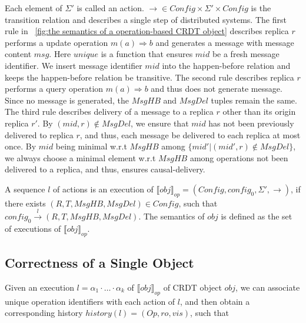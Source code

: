 {Each element of $\Sigma'$ is called an action. $\rightarrow \in \mathit{Config} \times \Sigma' \times \mathit{Config}$ is the transition relation and describes a single step of distributed systems. The first rule in \figurename~\ref{fig:the semantics of a operation-based CRDT object} describes replica $r$ performs a update operation $m(a) \Rightarrow b$ and generates a message with message content $\mathit{msg}$. Here $\mathit{unique}$ is a function that ensures $\mathit{mid}$ be a fresh message identifier. We insert message identifier $\mathit{mid}$ into the happen-before relation and keeps the happen-before relation be transitive. The second rule describes replica $r$ performs a query operation $m(a) \Rightarrow b$ and thus does not generate message. Since no message is generated, the $\mathit{MsgHB}$ and $\mathit{MsgDel}$ tuples remain the same. The third rule describes delivery of a message to a replica $r$ other than its origin replica $r'$. By $(\mathit{mid},r) \notin \mathit{MsgDel}$, we ensure that $\mathit{mid}$ has not been previously delivered to replica $r$, and thus, each message be delivered to each replica at most once. By $\mathit{mid}$ being minimal w.r.t $\mathit{MsgHB}$ among $\{ \mathit{mid}' \vert (\mathit{mid}',r) \notin \mathit{MsgDel} \}$, we always choose a minimal element w.r.t $\mathit{MsgHB}$ among operations not been delivered to a replica, and thus, ensures causal-delivery.



A sequence $l$ of actions is an execution of $\llbracket \mathit{obj} \rrbracket_{\mathit{op}} = (\mathit{Config},\mathit{config}_0,\Sigma',\rightarrow)$, if there exists $(R,T,\mathit{MsgHB},\mathit{MsgDel}) \in \mathit{Config}$, such that $\mathit{config}_0 {\xrightarrow{ l }} (R,T,\mathit{MsgHB},\mathit{MsgDel})$. The semantics of $\mathit{obj}$ is defined as the set of executions of $\llbracket \mathit{obj} \rrbracket_{\mathit{op}}$.




\subsection{Correctness of a Single Object}
\label{subsec:correctness of a single object}

Given an execution $l = \alpha_1 \cdot \ldots \cdot \alpha_k$ of $\llbracket \mathit{obj} \rrbracket_{\mathit{op}}$ of CRDT object $\mathit{obj}$, we can associate unique operation identifiers with each action of $l$, and then obtain a corresponding history $\mathit{history}(l) = (\mathit{Op},\mathit{ro},\mathit{vis})$, such that

}
